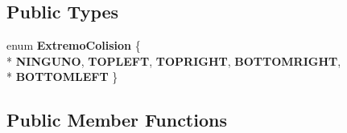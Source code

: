 \subsection*{Public Types}
\begin{DoxyCompactItemize}
\item 
enum {\bfseries Extremo\+Colision} \{ \\*
{\bfseries N\+I\+N\+G\+U\+NO}, 
{\bfseries T\+O\+P\+L\+E\+FT}, 
{\bfseries T\+O\+P\+R\+I\+G\+HT}, 
{\bfseries B\+O\+T\+T\+O\+M\+R\+I\+G\+HT}, 
\\*
{\bfseries B\+O\+T\+T\+O\+M\+L\+E\+FT}
 \}\hypertarget{class_nivel_mapa_af0608f1554ebdf3de2ab2e8390ccd4e7}{}\label{class_nivel_mapa_af0608f1554ebdf3de2ab2e8390ccd4e7}

\end{DoxyCompactItemize}
\subsection*{Public Member Functions}
